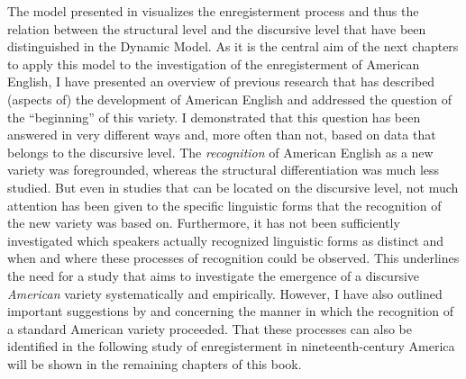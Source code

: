 The model presented in  visualizes the enregisterment process and thus the relation between the structural level and the discursive level that have been distinguished in the Dynamic Model. As it is the central aim of the next chapters to apply this model to the investigation of the enregisterment of American English, I have presented an overview of previous research that has described (aspects of) the development of American English and addressed the question of the “beginning” of this variety. I demonstrated that this question has been answered in very different ways and, more often than not, based on data that belongs to the discursive level. The \emph{recognition} of American English as a new variety was foregrounded, whereas the structural differentiation was much less studied. But even in studies that can be located on the discursive level, not much attention has been given to the specific linguistic forms that the recognition of the new variety was based on. Furthermore, it has not been sufficiently investigated which speakers actually recognized linguistic forms as distinct and when and where these processes of recognition could be observed. This underlines the need for a study that aims to investigate the emergence of a discursive \textit{American} variety systematically and empirically. However, I have also outlined important suggestions by \citet{Cooley1992} and \citet{Minnick2010} concerning the manner in which the recognition of a standard American variety proceeded. That these processes can also be identified in the following study of enregisterment in nineteenth-century America will be shown in the remaining chapters of this book.

